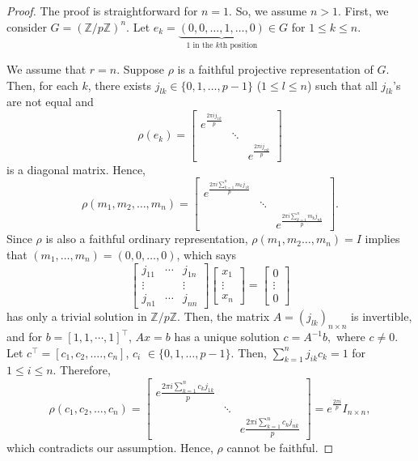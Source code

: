 \documentclass[a4paper,11pt]{amsart}
\numberwithin{equation}{section}
\numberwithin{equation}{subsection}
\newcommand{\Z}{\mathbb{Z}}
\begin{document}
\begin{proof}
	The proof is straightforward for $n=1$. So, we assume $n>1$. First, we consider $G=(\mathbb Z/p\mathbb Z)^n$. Let $e_{k}= \underbrace{(0,0, \ldots, 1, \ldots, 0)}_\text{$1$ in the $k{\text {th}}$ position} \in G$ for $1 \leq k \leq n$.
	
	We assume that $r=n$.  
	Suppose $\rho$ is a faithful projective representation of $G$. Then, for each $k$, there exists $j_{l k} \in \{0,1, \ldots, p-1\}$ ($1\leq l \leq n $) such that all $j_{l k}$'s are not equal and $$\rho(e_{k})=
	\left[\begin{array}{ccc}e^{\frac{2 \pi ij_{1k}}{p}} &  & \\
		& \ddots & \\
		& & e^{\frac{2 \pi ij_{nk}}{p}}\end{array}\right]$$
	is a diagonal matrix. Hence, $$\rho\left(m_{1}, m_{2}, \ldots, m_{n}\right)
	=\left[\begin{array}{ccc}e^{\frac{2 \pi i \sum\limits_{k=1}^{n} m_{k} j_{1 k}}{p}} &  & \\
		& \ddots & \\
		& & e^{\frac{2 \pi i \sum \limits_{k=1}^{n} m_{k} j_{n k}}{p}}\end{array}\right].$$                                            
	Since $\rho$ is also a faithful ordinary representation, $\rho\left(m_{1}, m_{2} \ldots, m_{n}\right)= I$ implies that $\left(m_{1}, \ldots, m_{n}\right)= (0,0, \ldots, 0)$, which says
	$$
	\left[\begin{array}{ccc}
		j_{11} & \cdots & j_{1 n} \\
		\vdots & &\vdots \\
		j_{n 1} & \cdots & j_{n n}
	\end{array}\right]\left[\begin{array}{c}
		x_{1} \\
		\vdots \\
		{x}_{n}
	\end{array}\right]= \left[\begin{array}{c}
		0 \\
		\vdots \\
		0
	\end{array}\right]
	$$
	has only a trivial solution in $\Z/p\Z$. Then, the matrix $A=(j_{lk})_{n\times n}$ is invertible,
	and for $b=[1,1,\cdots, 1]^{\top}$, $A x=b$ has a unique solution $c=A^{-1} b,$ where $c \neq 0$.
	Let $c^{\top}= \left[c_{1}, c_{2}, \ldots ., c_{n}\right]$, 
	$c_{i}$ $\in \{0,1, \ldots, p-1\}$.
	Then, $\sum\limits_{k=1}^{n} j_{i k} c_{k}= 1$ for $1\leq i \leq n$. Therefore, 
	\[\rho\left(c_{1}, c_{2}, \ldots, c_{n}\right)=
	\left[\begin{array}{ccc}
		e\frac{2 \pi i \sum\limits_{k=1}^n c_k j_{1k}}{p} & & \\
		& \ddots & \\
		&  & e \frac{2 \pi i \sum\limits_{k=1}^n c_k j_{nk}}{p} 
	\end{array}\right]
	= e^{\frac{2 \pi i}{p}} I_{n \times n},
	\] which contradicts our assumption. Hence, $\rho$ cannot be faithful. 
	

\end{proof}
\end{document}
